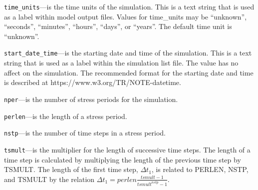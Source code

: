 
\item \texttt{time\_units}---is the time units of the simulation.  This is a text string that is used as a label within model output files.  Values for time\_units may be ``unknown'',  ``seconds'', ``minutes'', ``hours'', ``days'', or ``years''.  The default time unit is ``unknown''.

\item \texttt{start\_date\_time}---is the starting date and time of the simulation.  This is a text string that is used as a label within the simulation list file.  The value has no affect on the simulation.  The recommended format for the starting date and time is described at https://www.w3.org/TR/NOTE-datetime.

\item \texttt{nper}---is the number of stress periods for the simulation.

\item \texttt{perlen}---is the length of a stress period.

\item \texttt{nstp}---is the number of time steps in a stress period.

\item \texttt{tsmult}---is the multiplier for the length of successive time steps. The length of a time step is calculated by multiplying the length of the previous time step by TSMULT. The length of the first time step, $\Delta t_1$, is related to PERLEN, NSTP, and TSMULT by the relation $\Delta t_1= perlen \frac{tsmult - 1}{tsmult^{nstp}-1}$.


